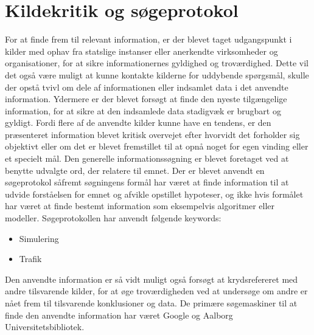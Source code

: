 \section{Kildekritik og søgeprotokol}
For at finde frem til relevant information, er der blevet taget udgangspunkt i kilder med ophav fra statslige instanser eller anerkendte virksomheder og organisationer, for at sikre informationernes gyldighed og troværdighed. Dette vil det også være muligt at kunne kontakte kilderne for uddybende spørgsmål, skulle der opstå tvivl om dele af informationen eller indsamlet data i det anvendte information. Ydermere er der blevet forsøgt at finde den nyeste tilgængelige information, for at sikre at den indsamlede data stadigvæk er brugbart og gyldigt. Fordi flere af de anvendte kilder kunne have en tendens, er den præsenteret information blevet kritisk overvejet efter hvorvidt det forholder sig objektivt eller om det er blevet fremstillet til at opnå noget for egen vinding eller et specielt mål. Den generelle informationssøgning er blevet foretaget ved at benytte udvalgte ord, der relatere til emnet.
Der er blevet anvendt en søgeprotokol såfremt søgningens formål har været at finde information til at udvide forståelsen for emnet og afvikle opstillet hypoteser, og ikke hvis formålet har været at finde bestemt information som eksempelvis algoritmer eller modeller. Søgeprotokollen har anvendt følgende keywords:

\begin{itemize}
\item Simulering
\item Trafik
\end{itemize}
 Den anvendte information er så vidt muligt også forsøgt at krydsrefereret med andre tilsvarende kilder, for at øge troværdigheden ved at undersøge om andre er nået frem til tilsvarende konklusioner og data. De primære søgemaskiner til at finde den anvendte information har været Google og Aalborg Universitetsbibliotek. 
